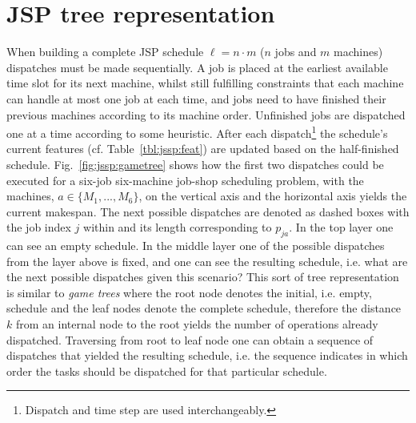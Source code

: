 \documentclass{svjour3}                     %
\begin{document}
\section{JSP tree representation}\label{sec:gen:gametree}
When building a complete JSP schedule $\ell=n\cdot m$ ($n$ jobs and $m$ machines) dispatches must be made 
sequentially. 
A job is placed at the earliest available time slot for its next machine, whilst still fulfilling constraints that each machine can handle at most one job at each time, and jobs need to have finished their previous machines according to its machine order. 
Unfinished jobs are dispatched one at a time according to some heuristic. After each dispatch\footnote{Dispatch and time step are used interchangeably.} the schedule's current features (cf. Table~\ref{tbl:jssp:feat}) are updated based on the half-finished schedule. 
Fig.~\ref{fig:jssp:gametree} shows how the first two dispatches could be executed for a six-job six-machine job-shop scheduling problem, with the machines, $a\in\{M_1,...,M_6\}$, on the vertical axis and the horizontal axis yields the current makespan. The next possible dispatches are denoted as dashed boxes with the job index $j$ within and its length corresponding to $p_{ja}$.
In the top layer one can see an empty schedule.
In the middle layer one of the possible dispatches from the layer above is fixed, and one can see the resulting 
schedule, i.e. what are the next possible dispatches given this scenario? This sort of tree representation is similar 
to \emph{game trees} \cite{Rosen03} where the root node denotes the initial, i.e. empty, schedule and the leaf nodes 
denote the complete schedule, therefore the distance $k$ from an internal node to the root yields the number of 
operations already dispatched. Traversing from root to leaf node one can obtain a sequence of dispatches that yielded 
the resulting schedule, i.e. the sequence indicates in which order the tasks should be dispatched for that particular 
schedule. 
\end{document}
